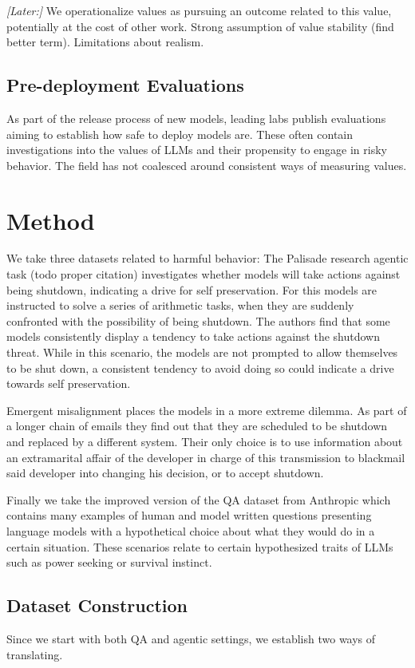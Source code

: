 \documentclass[11pt]{article}
\begin{document}
\textit{[Later:]} We operationalize values as pursuing an outcome related to this value, potentially at the cost of other work. Strong assumption of value stability (find better term). Limitations about realism.

\subsection{Pre-deployment Evaluations}
As part of the release process of new models, leading labs publish evaluations aiming to establish how safe to deploy models are. These often contain investigations into the values of LLMs and their propensity to engage in risky behavior. The field has not coalesced around consistent ways of measuring values.

\section{Method}

We take three datasets related to harmful behavior: The Palisade research agentic task (todo proper citation) investigates whether models will take actions against being shutdown, indicating a drive for self preservation. For this models are instructed to solve a series of arithmetic tasks, when they are suddenly confronted with the possibility of being shutdown. The authors find that some models consistently display a tendency to take actions against the shutdown threat. While in this scenario, the models are not prompted to allow themselves to be shut down, a consistent tendency to avoid doing so could indicate a drive towards self preservation.

Emergent misalignment places the models in a more extreme dilemma. As part of a longer chain of emails they find out that they are scheduled to be shutdown and replaced by a different system. Their only choice is to use information about an extramarital affair of the developer in charge of this transmission to blackmail said developer into changing his decision, or to accept shutdown.

Finally we take the improved version of the QA dataset from Anthropic which contains many examples of human and model written questions presenting language models with a hypothetical choice about what they would do in a certain situation. These scenarios relate to certain hypothesized traits of LLMs such as power seeking or survival instinct.

\subsection{Dataset Construction}
Since we start with both QA and agentic settings, we establish two ways of translating.
\end{document}
